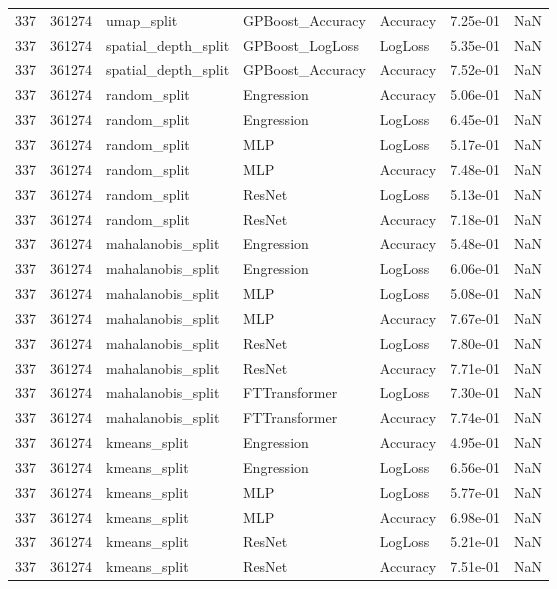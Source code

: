 \begin{tabular}{rrlllrr}
337 & 361274 & umap\_split & GPBoost\_Accuracy & Accuracy & 7.25e-01 & NaN \\
337 & 361274 & spatial\_depth\_split & GPBoost\_LogLoss & LogLoss & 5.35e-01 & NaN \\
337 & 361274 & spatial\_depth\_split & GPBoost\_Accuracy & Accuracy & 7.52e-01 & NaN \\
337 & 361274 & random\_split & Engression & Accuracy & 5.06e-01 & NaN \\
337 & 361274 & random\_split & Engression & LogLoss & 6.45e-01 & NaN \\
337 & 361274 & random\_split & MLP & LogLoss & 5.17e-01 & NaN \\
337 & 361274 & random\_split & MLP & Accuracy & 7.48e-01 & NaN \\
337 & 361274 & random\_split & ResNet & LogLoss & 5.13e-01 & NaN \\
337 & 361274 & random\_split & ResNet & Accuracy & 7.18e-01 & NaN \\
337 & 361274 & mahalanobis\_split & Engression & Accuracy & 5.48e-01 & NaN \\
337 & 361274 & mahalanobis\_split & Engression & LogLoss & 6.06e-01 & NaN \\
337 & 361274 & mahalanobis\_split & MLP & LogLoss & 5.08e-01 & NaN \\
337 & 361274 & mahalanobis\_split & MLP & Accuracy & 7.67e-01 & NaN \\
337 & 361274 & mahalanobis\_split & ResNet & LogLoss & 7.80e-01 & NaN \\
337 & 361274 & mahalanobis\_split & ResNet & Accuracy & 7.71e-01 & NaN \\
337 & 361274 & mahalanobis\_split & FTTransformer & LogLoss & 7.30e-01 & NaN \\
337 & 361274 & mahalanobis\_split & FTTransformer & Accuracy & 7.74e-01 & NaN \\
337 & 361274 & kmeans\_split & Engression & Accuracy & 4.95e-01 & NaN \\
337 & 361274 & kmeans\_split & Engression & LogLoss & 6.56e-01 & NaN \\
337 & 361274 & kmeans\_split & MLP & LogLoss & 5.77e-01 & NaN \\
337 & 361274 & kmeans\_split & MLP & Accuracy & 6.98e-01 & NaN \\
337 & 361274 & kmeans\_split & ResNet & LogLoss & 5.21e-01 & NaN \\
337 & 361274 & kmeans\_split & ResNet & Accuracy & 7.51e-01 & NaN \\

\end{tabular}
